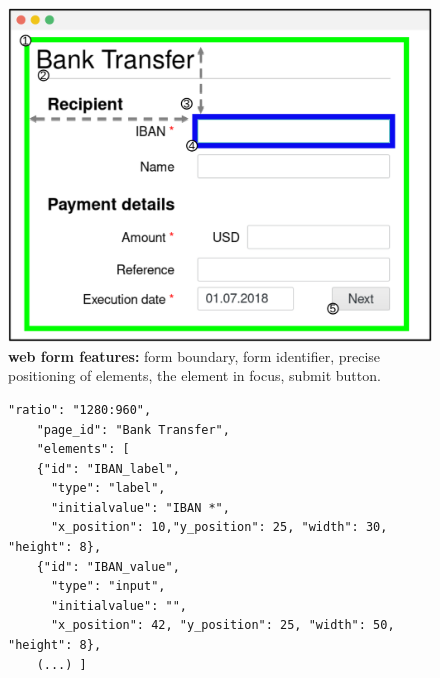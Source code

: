 \begin{figure}[t]
	\centering
\includegraphics[width=0.55\linewidth]{chapters/IntegriScreen/img/runningExample.png}
	\caption{\textbf{\name{} web form features:} \one form boundary, \two form identifier, \three precise positioning of elements, \four the element in focus, \five submit button.
}
	\label{fig:runningExample}
\end{figure}

\begin{figure}[t]
\begin{lstlisting}[mathescape=true]
    "ratio": "1280:960",
    "page_id": "Bank Transfer",
    "elements": [
    {"id": "IBAN_label",
      "type": "label",
      "initialvalue": "IBAN *",
      "x_position": 10,"y_position": 25, "width": 30, "height": 8},
    {"id": "IBAN_value",
      "type": "input",
      "initialvalue": "",
      "x_position": 42, "y_position": 25, "width": 50, "height": 8},
    (...) ]
\end{lstlisting}
\end{figure}


